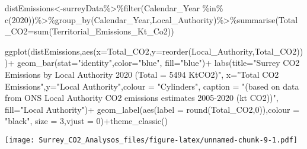 \documentclass[
]{article}
\newenvironment{Shaded}{\begin{snugshade}}{\end{snugshade}}
\newcommand{\AttributeTok}[1]{\textcolor[rgb]{0.77,0.63,0.00}{#1}}
\newcommand{\DecValTok}[1]{\textcolor[rgb]{0.00,0.00,0.81}{#1}}
\newcommand{\FunctionTok}[1]{\textcolor[rgb]{0.00,0.00,0.00}{#1}}
\newcommand{\NormalTok}[1]{#1}
\newcommand{\OtherTok}[1]{\textcolor[rgb]{0.56,0.35,0.01}{#1}}
\newcommand{\SpecialCharTok}[1]{\textcolor[rgb]{0.00,0.00,0.00}{#1}}
\newcommand{\StringTok}[1]{\textcolor[rgb]{0.31,0.60,0.02}{#1}}
\begin{document}
\begin{Shaded}
\begin{Highlighting}[]
\NormalTok{distEmissions}\OtherTok{\textless{}{-}}\NormalTok{surreyData}\SpecialCharTok{\%\textgreater{}\%}\FunctionTok{filter}\NormalTok{(Calendar\_Year }\SpecialCharTok{\%in\%} \FunctionTok{c}\NormalTok{(}\DecValTok{2020}\NormalTok{))}\SpecialCharTok{\%\textgreater{}\%}\FunctionTok{group\_by}\NormalTok{(Calendar\_Year,Local\_Authority)}\SpecialCharTok{\%\textgreater{}\%}\FunctionTok{summarise}\NormalTok{(}\AttributeTok{Total\_CO2=}\FunctionTok{sum}\NormalTok{(Territorial\_Emissions\_Kt\_Co2))}

\FunctionTok{ggplot}\NormalTok{(distEmissions,}\FunctionTok{aes}\NormalTok{(}\AttributeTok{x=}\NormalTok{Total\_CO2,}\AttributeTok{y=}\FunctionTok{reorder}\NormalTok{(Local\_Authority,Total\_CO2)))}\SpecialCharTok{+}
   \FunctionTok{geom\_bar}\NormalTok{(}\AttributeTok{stat=}\StringTok{"identity"}\NormalTok{,}\AttributeTok{color=}\StringTok{"blue"}\NormalTok{, }\AttributeTok{fill=}\StringTok{"blue"}\NormalTok{)}\SpecialCharTok{+}  \FunctionTok{labs}\NormalTok{(}\AttributeTok{title=}\StringTok{"Surrey CO2 Emissions by Local Authority 2020 (Total = 5494 KtCO2)"}\NormalTok{, }\AttributeTok{x=}\StringTok{"Total CO2 Emissions"}\NormalTok{,}\AttributeTok{y=}\StringTok{"Local Authority"}\NormalTok{,}\AttributeTok{colour =} \StringTok{"Cylinders"}\NormalTok{, }\AttributeTok{caption =} \StringTok{"(based on data from  ONS Local Authority CO2 emissions estimates 2005{-}2020 (kt CO2))"}\NormalTok{, }\AttributeTok{fill=}\StringTok{"Local Authority"}\NormalTok{)}\SpecialCharTok{+} 
  \FunctionTok{geom\_label}\NormalTok{(}\FunctionTok{aes}\NormalTok{(}\AttributeTok{label =} \FunctionTok{round}\NormalTok{(Total\_CO2,}\DecValTok{0}\NormalTok{)),}\AttributeTok{colour =} \StringTok{"black"}\NormalTok{, }\AttributeTok{size =} \DecValTok{3}\NormalTok{,}\AttributeTok{vjust =} \DecValTok{0}\NormalTok{)}\SpecialCharTok{+}\FunctionTok{theme\_classic}\NormalTok{()}
\end{Highlighting}
\end{Shaded}

\texttt{[image: Surrey\_CO2\_Analysos\_files/figure-latex/unnamed-chunk-9-1.pdf]}
\end{document}
